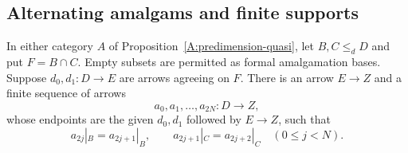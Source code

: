 \subsection{Alternating amalgams and finite supports}

\begin{lemma}
\label{A:predimension-alternating-bridge}
In either category $A$ of
Proposition~\ref{A:predimension-quasi}, let $B,C\leq_d D$ and put
$F=B\cap C$. Empty subsets are permitted as formal amalgamation
bases. Suppose $d_0,d_1:D\to E$ are arrows agreeing on $F$.
There is an arrow $E\to Z$ and a finite sequence of arrows
\[
 a_0,a_1,\ldots,a_{2N}:D\longrightarrow Z,
\]
whose endpoints are the given $d_0,d_1$ followed by $E\to Z$, such that
\[
 a_{2j}|_B=a_{2j+1}|_B,
 \qquad
 a_{2j+1}|_C=a_{2j+2}|_C
 \quad(0\leq j<N).
\]
\end{lemma}
